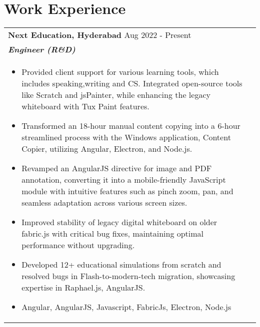 \documentclass[a4paper,8pt]{article}
\begin{document}
\section{Work Experience}
\begin{tabularx}{\linewidth}{ @{}l r@{} }
\textbf{{Next Education, Hyderabad}} \hfill \color[HTML]{371e77} Aug 2022 - Present \\[4pt]
\color[HTML]{371e77}\textbf{\textit{Engineer (R\&D) }}\ \hfill \color[HTML]{4B28A4} \\[5pt]
\begin{minipage}[t]{\linewidth}
    \begin{itemize}[nosep,after=\strut, leftmargin=2em, itemsep=2pt]
        \item Provided client support for various learning tools, which includes speaking,writing and CS. Integrated open-source tools like Scratch and jsPainter, while enhancing the legacy whiteboard with Tux Paint features.
        \item Transformed an 18-hour manual content copying into a 6-hour streamlined process with the Windows application, Content Copier, utilizing Angular, Electron, and Node.js.
        \item Revamped an AngularJS directive for image and PDF annotation, converting it into a mobile-friendly JavaScript module with intuitive features such as pinch zoom, pan, and seamless adaptation across various screen sizes.
        \item Improved stability of legacy digital whiteboard on older fabric.js with critical bug fixes, maintaining optimal performance without upgrading.
        \item Developed 12+ educational simulations from scratch and resolved  bugs in Flash-to-modern-tech migration, showcasing expertise in Raphael.js, AngularJS.
        \item Angular, AngularJS, Javascript, FabricJs, Electron, Node.js
    \end{itemize}
\end{minipage}
\end{tabularx}
\end{document}
